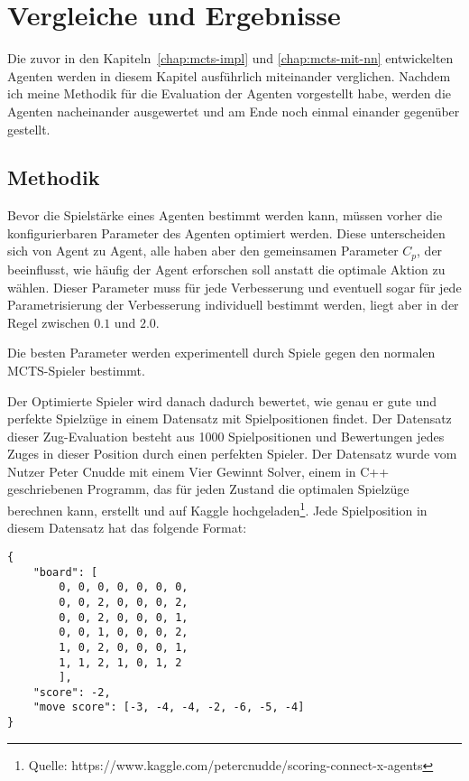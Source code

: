 \section{Vergleiche und Ergebnisse}
\label{chap:results}

Die zuvor in den Kapiteln~\ref{chap:mcts-impl} und \ref{chap:mcts-mit-nn} entwickelten Agenten werden in diesem Kapitel ausführlich miteinander verglichen.
Nachdem ich meine Methodik für die Evaluation der Agenten vorgestellt habe, werden die Agenten nacheinander ausgewertet und am Ende noch einmal einander gegenüber gestellt.

\subsection{Methodik}
\label{subsec:methodik}

Bevor die Spielstärke eines Agenten bestimmt werden kann, müssen vorher die konfigurierbaren Parameter des Agenten optimiert werden.
Diese unterscheiden sich von Agent zu Agent, alle haben aber den gemeinsamen Parameter $C_p$, der beeinflusst, wie häufig der Agent erforschen soll anstatt die optimale Aktion zu wählen.
Dieser Parameter muss für jede Verbesserung und eventuell sogar für jede Parametrisierung der Verbesserung individuell bestimmt werden, liegt aber in der Regel zwischen $0.1$ und $2.0$.

Die besten Parameter werden experimentell durch Spiele gegen den normalen MCTS-Spieler bestimmt.

\bigskip
Der Optimierte Spieler wird danach dadurch bewertet, wie genau er gute und perfekte Spielzüge in einem Datensatz mit Spielpositionen findet.
Der Datensatz dieser Zug-Evaluation besteht aus 1000 Spielpositionen und Bewertungen jedes Zuges in dieser Position durch einen perfekten Spieler.
Der Datensatz wurde vom Nutzer Peter Cnudde mit einem Vier Gewinnt Solver, einem in C++ geschriebenen Programm, das für jeden Zustand die optimalen Spielzüge berechnen kann, erstellt und auf Kaggle hochgeladen\footnote{Quelle: https://www.kaggle.com/petercnudde/scoring-connect-x-agents}.
Jede Spielposition in diesem Datensatz hat das folgende Format:

\begin{verbatim}
{
    "board": [
        0, 0, 0, 0, 0, 0, 0,
        0, 0, 2, 0, 0, 0, 2,
        0, 0, 2, 0, 0, 0, 1,
        0, 0, 1, 0, 0, 0, 2,
        1, 0, 2, 0, 0, 0, 1,
        1, 1, 2, 1, 0, 1, 2
        ],
    "score": -2,
    "move score": [-3, -4, -4, -2, -6, -5, -4]
}
\end{verbatim}

